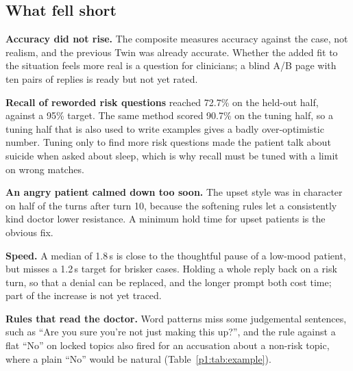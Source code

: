 \documentclass[journal]{IEEEtran}
\begin{document}
\subsection{What fell short}
\textbf{Accuracy did not rise.} The composite measures accuracy against the case, not realism, and the previous Twin was already accurate.
Whether the added fit to the situation feels more real is a question for clinicians; a blind A/B page with ten pairs of replies is ready but not
yet rated.

\textbf{Recall of reworded risk questions} reached 72.7\% on the held-out half, against a 95\% target. The same method scored 90.7\% on the tuning
half, so a tuning half that is also used to write examples gives a badly over-optimistic number. Tuning only to find more risk questions made the
patient talk about suicide when asked about sleep, which is why recall must be tuned with a limit on wrong matches.

\textbf{An angry patient calmed down too soon.} The upset style was in character on half of the turns after turn 10, because the softening rules
let a consistently kind doctor lower resistance. A minimum hold time for upset patients is the obvious fix.

\textbf{Speed.} A median of 1.8\,s is close to the thoughtful pause of a low-mood patient, but misses a 1.2\,s target for brisker cases. Holding
a whole reply back on a risk turn, so that a denial can be replaced, and the longer prompt both cost time; part of the increase is not yet
traced.

\textbf{Rules that read the doctor.} Word patterns miss some judgemental sentences, such as ``Are you sure you're not just making this up?'', and
the rule against a flat ``No'' on locked topics also fired for an accusation about a non-risk topic, where a plain ``No'' would be natural
(Table~\ref{p1:tab:example}).
\end{document}
